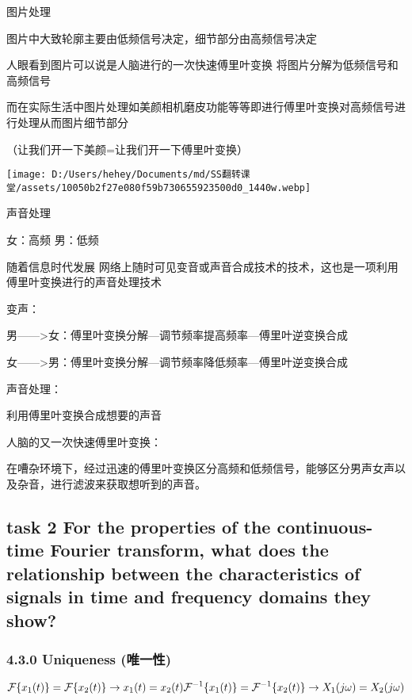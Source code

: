\documentclass[
]{article}
\begin{document}
图片处理

图片中大致轮廓主要由低频信号决定，细节部分由高频信号决定

人眼看到图片可以说是人脑进行的一次快速傅里叶变换
将图片分解为低频信号和高频信号

而在实际生活中图片处理如美颜相机磨皮功能等等即进行傅里叶变换对高频信号进行处理从而图片细节部分

（让我们开一下美颜=让我们开一下傅里叶变换）

\texttt{[image: D:/Users/hehey/Documents/md/SS翻转课堂/assets/10050b2f27e080f59b730655923500d0\_1440w.webp]}

声音处理

女：高频 男：低频

随着信息时代发展
网络上随时可见变音或声音合成技术的技术，这也是一项利用傅里叶变换进行的声音处理技术

变声：

男------\textgreater 女：傅里叶变换分解---调节频率提高频率---傅里叶逆变换合成

女------\textgreater 男：傅里叶变换分解---调节频率降低频率---傅里叶逆变换合成

声音处理：

利用傅里叶变换合成想要的声音

人脑的又一次快速傅里叶变换：

在嘈杂环境下，经过迅速的傅里叶变换区分高频和低频信号，能够区分男声女声以及杂音，进行滤波来获取想听到的声音。

\subsection{task 2 For the properties of the continuous-time Fourier
transform, what does the relationship between the characteristics of
signals in time and frequency domains they
show?}\label{task-2-for-the-properties-of-the-continuous-time-fourier-transform-what-does-the-relationship-between-the-characteristics-of-signals-in-time-and-frequency-domains-they-show}

\subsubsection{4.3.0 Uniqueness
(唯一性)}\label{430-uniqueness-ux552fux4e00ux6027}

\[\mathcal{F}\{x_1(t)\}=\mathcal{F}\{x_2(t)\}  \to x_1(t)=x_2(t)\\
\mathcal{F}^{-1}\{x_1(t)\}=\mathcal{F}^{-1}\{x_2(t)\}  \to X_1(j\omega)=X_2(j\omega)\]
\end{document}
